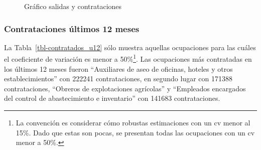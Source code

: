 \documentclass[
  11pt,
]{article}
\begin{document}
\begin{figure}[H]

\caption{\label{fig-salidas_contrataciones}Gráfico salidas y
contrataciones}


\end{figure}%

\subsubsection{Contrataciones últimos 12
meses}\label{contrataciones-uxfaltimos-12-meses}

La Tabla~\ref{tbl-contratados_u12} sólo muestra aquellas ocupaciones
para las cuáles el coeficiente de variación es menor a 50\%\footnote{La
  convención es considerar cómo robustas estimaciones con un cv menor al
  15\%. Dado que estas son pocas, se presentan todas las ocupaciones con
  un cv menor a 50\%.}. Las ocupaciones más contratadas en los últimos
12 meses fueron ``Auxiliares de aseo de oficinas, hoteles y otros
establecimientos'' con 222241 contrataciones, en segundo lugar con
171388 contrataciones, ``Obreros de explotaciones agrícolas'' y
``Empleados encargados del control de abastecimiento e inventario'' con
141683 contrataciones. \FloatBarrier
\end{document}
